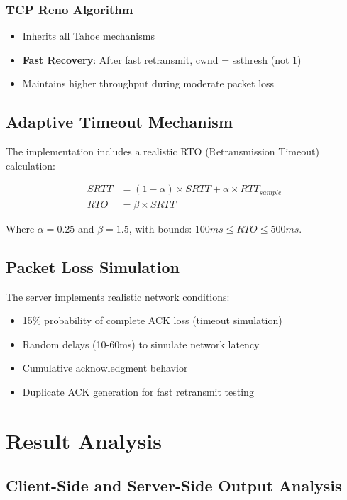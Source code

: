 \documentclass[12pt]{article}
\begin{document}
\subsubsection{TCP Reno Algorithm}
\begin{itemize}
    \item Inherits all Tahoe mechanisms
    \item \textbf{Fast Recovery}: After fast retransmit, cwnd = ssthresh (not 1)
    \item Maintains higher throughput during moderate packet loss
\end{itemize}

\subsection{Adaptive Timeout Mechanism}

The implementation includes a realistic RTO (Retransmission Timeout) calculation:

\begin{align}
SRTT &= (1-\alpha) \times SRTT + \alpha \times RTT_{sample} \\
RTO &= \beta \times SRTT
\end{align}

Where $\alpha = 0.25$ and $\beta = 1.5$, with bounds: $100ms \leq RTO \leq 500ms$.

\subsection{Packet Loss Simulation}

The server implements realistic network conditions:
\begin{itemize}
    \item 15\% probability of complete ACK loss (timeout simulation)
    \item Random delays (10-60ms) to simulate network latency
    \item Cumulative acknowledgment behavior
    \item Duplicate ACK generation for fast retransmit testing
\end{itemize}

\section{Result Analysis}

\subsection{Client-Side and Server-Side Output Analysis}
\end{document}
